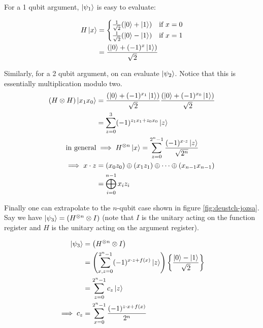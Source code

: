 \documentclass[reprint, amsmath,amssymb, aps]{revtex4-2}
\begin{document}
                For a 1 qubit argument, $\ket{\psi_1}$ is easy to evaluate:

                \begin{align*}
                    H \ket{x} &= 
                        \begin{cases}
                            \frac{1}{\sqrt{2}} (\ket{0} + \ket{1})  &\text{if} \ x=0 \\
                            \frac{1}{\sqrt{2}} (\ket{0} - \ket{1}) &\text{if} \ x=1 
                        \end{cases} \\
                    &= \frac{(\ket{0}+ (-1)^x\ket{1})}{\sqrt{2}}
                \end{align*}

                Similarly, for a 2 qubit argument, on can evaluate $\ket{\psi_2}$. Notice that this is essentially multiplication modulo two.
                \begin{align*}
                (H\otimes H) \ket{x_1 x_0} &= \frac{(\ket{0}+ (-1)^{x_1}\ket{1})}{\sqrt{2}}\frac{(\ket{0}+ (-1)^{x_0}\ket{1})}{\sqrt{2}} \\
                &= \sum_{z=0}^3(-1)^{z_1 x_1 + z_0 x_0} \ket{z} \\
                \text{in general} &\implies H^{\otimes n}\ket{x} = \sum_{z=0}^{2^n-1}\frac{(-1)^{x\cdot z}\ket{z}}{\sqrt{2^n}} \\
                \implies x\cdot z &= (x_0z_0)\oplus (x_1 z_1)\oplus \cdots \oplus (x_{n-1}x_{n-1}) \\
                &= \bigoplus_{i=0}^{n-1}x_i z_i
                \end{align*}

                Finally one can extrapolate to the $n$-qubit case shown in figure \ref{fig:deustch-jozsa}. Say we have $\ket{\psi_3} = \left(H^{\otimes n}\otimes I\right)$ (note that $I$ is the unitary acting on the function register and $H$ is the unitary acting on the argument register). 

                \begin{align*}
                \ket{\psi_3} &= \left(H^{\otimes n}\otimes I\right) \\
                &= \left(\sum_{x,z=0}^{2^n -1}(-1)^{x\cdot z + f(x)}\ket{z}\right)\left\{\frac{\ket{0}-\ket{1}}{\sqrt{2}}\right\}\\
                &= \sum_{z=0}^{2^n-1}c_z\ket{z} \\
                \implies c_z &= \sum_{x=0}^{2^n - 1}\frac{(-1)^{z\cdot x + f(x)}}{2^n}
                \end{align*}
\end{document}
